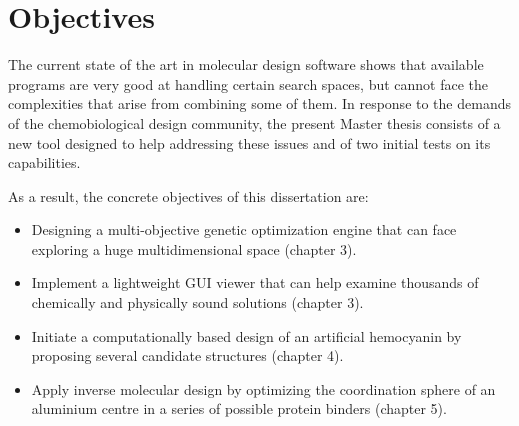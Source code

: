\chapter{Objectives}%

The current state of the art in molecular design software shows that available programs are very good at handling certain search spaces, but cannot face the complexities that arise from combining some of them.
In response to the demands of the chemobiological design community, the present Master thesis consists of a new tool designed to help addressing these issues and of two initial tests on its capabilities.

As a result, the concrete objectives of this dissertation are:
%

\newenvironment{myitemize}
{ \begin{itemize}
    \setlength{\itemsep}{0pt}
    \setlength{\parskip}{0pt}
    \setlength{\parsep}{0pt}     }
{ \end{itemize}                  } 

\begin{myitemize}
\item Designing a multi-objective genetic optimization engine that can face exploring a huge multidimensional space (chapter 3).

\item Implement a lightweight GUI viewer that can help examine thousands of chemically and physically sound solutions (chapter 3).

\item Initiate a computationally based design of an artificial hemocyanin by proposing several candidate structures (chapter 4).

\item Apply inverse molecular design by optimizing the coordination sphere of an aluminium centre in a series of possible protein binders (chapter 5).

\end{myitemize}

